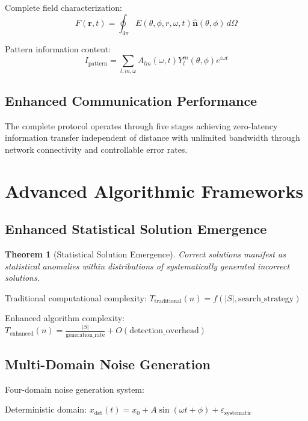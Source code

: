 \documentclass[12pt,a4paper]{article}
\newtheorem{theorem}{Theorem}[section]
\begin{document}
Complete field characterization:
\begin{equation}
F(\mathbf{r},t) = \oint_{4\pi} E(\theta,\phi,r,\omega,t)\hat{\mathbf{n}}(\theta,\phi) \, d\Omega
\end{equation}

Pattern information content:
\begin{equation}
I_{\text{pattern}} = \sum_{l,m,\omega} A_{lm}(\omega,t)Y_l^m(\theta,\phi)e^{i\omega t}
\end{equation}

\subsection{Enhanced Communication Performance}

The complete protocol operates through five stages achieving zero-latency information transfer independent of distance with unlimited bandwidth through network connectivity and controllable error rates.

\section{Advanced Algorithmic Frameworks}

\subsection{Enhanced Statistical Solution Emergence}

\begin{theorem}[Statistical Solution Emergence]
Correct solutions manifest as statistical anomalies within distributions of systematically generated incorrect solutions.
\end{theorem}

Traditional computational complexity: $T_{\text{traditional}}(n) = f(|S|, \text{search\_strategy})$

Enhanced algorithm complexity: $T_{\text{enhanced}}(n) = \frac{|S|}{\text{generation\_rate}} + O(\text{detection\_overhead})$

\subsection{Multi-Domain Noise Generation}

Four-domain noise generation system:

Deterministic domain: $x_{\text{det}}(t) = x_0 + A \sin(\omega t + \phi) + \varepsilon_{\text{systematic}}$
\end{document}
